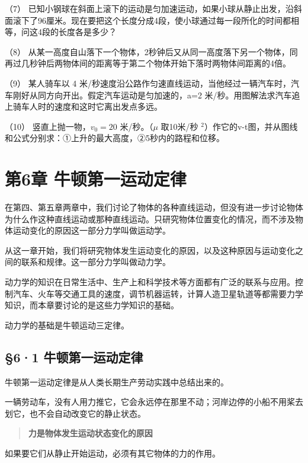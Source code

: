 （7）
已知小钢球在斜面上滚下的运动是匀加速运动，如果小球从静止出发，沿斜面滚下了96厘米。现在要把这个长度分成4段，使小球通过每一段所化的时间都相等，问这4段的长度各是多少？

（8）
从某一高度自山落下一个物体，2秒钟后又从同一高度落下另一个物体，同再过几秒钟后两物体间的距离等于第二个物体开始下落时两物体间距离的4倍。

（9） 某人骑车以 4
米/秒速度沿公路作匀速直线运动，当他经过一辆汽车时，汽车刚好从同方向开出。假定汽车运动是匀加速的，a=2
米/秒。用图解法求汽车追上骑车人时的速度和这时它离出发点多远。

（10） 竖直上抛一物，\(v_{0}=20\) 米/秒。（\(\mu\) 取10米/秒
\(^{2}\)）作它的v-t图，并从图线和公式分别求：①上升的最大高度，②5秒内的路程和位移。

\chapter{第6章
牛顿第一运动定律}\label{ux7b2c6ux7ae0-ux725bux987fux7b2cux4e00ux8fd0ux52a8ux5b9aux5f8b}

在第四、第五章两章中，我们讨论了物体的各种直线运动，但没有进一步讨论物体为什么作这种直线运动或那种直线运动。只研究物体位置变化的情况，而不涉及物体运动变化的原因这一部分力学叫做运动学。

从这一章开始，我们将研究物体发生运动变化的原因，以及这种原因与运动变化之间的联系和规律。这一部分力学叫做动力学。

动力学的知识在日常生活中、生产上和科学技术等方面都有广泛的联系与应用。控制汽车、火车等交通工具的速度，调节机器运转，计算人造卫星轨道等都需要力学知识，而本章要讨论的是这些力学知识的基础。

动力学的基础是牛顿运动三定律。

\section{§6·1
牛顿第一运动定律}\label{ux725bux987fux7b2cux4e00ux8fd0ux52a8ux5b9aux5f8b}

牛顿第一运动定律是从人类长期生产劳动实践中总结出来的。

一辆劳动车，没有人用力推它，它会永远停在那里不动；河岸边停的小船不用桨去划它，也不会自动改变它的静止状态。

\begin{quote}
\textbf{力是物体发生运动状态变化的原因}
\end{quote}

如果要它们从静止开始运动，必须有其它物体的力的作用。

